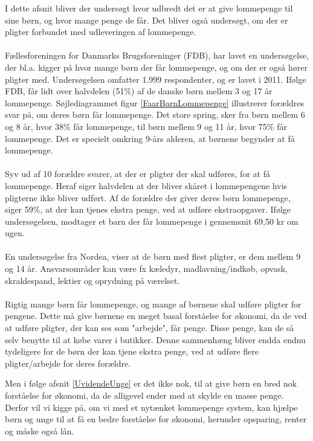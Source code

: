 I dette afsnit bliver der undersøgt hvor udbredt det er at give lommepenge til sine børn, og hvor mange penge de får. Det bliver også undersøgt, om der er pligter forbundet med udleveringen af lommepenge.\\
\\
Fællesforeningen for Danmarks Brugsforeninger (FDB), har lavet en undersøgelse, der bl.a. kigger på hvor mange børn der får lommepenge, og om der er også hører pligter med. \cite{FDB1} Undersøgelsen omfatter 1.999 respondenter, og er lavet i 2011.
Ifølge FDB, får lidt over halvdelen (51\%) af de danske børn mellem 3 og 17 år lommepenge. Søjlediagrammet figur \ref{FaarBarnLommepenge} illustrerer forældres svar på, om deres børn får lommepenge. Det store spring, sker fra børn mellem 6 og 8 år, hvor 38\% får lommepenge, til børn mellem 9 og 11 år, hvor 75\% får lommepenge. Det er specielt omkring 9-års alderen, at børnene begynder at få lommepenge. \\
\\
Syv ud af 10 forældre svarer, at der er pligter der skal udføres, for at få lommepenge. Heraf siger halvdelen at der bliver skåret i lommepengene hvis pligterne ikke bliver udført. Af de forældre der giver deres børn lommepenge, siger 59\%, at der kan tjenes ekstra penge, ved at udføre ekstraopgaver.
Ifølge undersøgelsen, modtager et barn der får lommepenge i gennemsnit 69,50 kr om ugen.\\
\\
En undersøgelse fra Nordea, viser at de børn med flest pligter, er dem mellem 9 og 14 år. Ansvarsområder kan være fx kæledyr, madlavning/indkøb, opvask, skraldespand, lektier og oprydning på værelset. \cite{Nordea1}\\
\\

Rigtig mange børn får lommepenge, og mange af børnene skal udføre pligter for pengene. Dette må give børnene en meget basal forståelse for økonomi, da de ved at udføre pligter, der kan ses som "arbejde", får penge. Disse penge, kan de så selv benytte til at købe varer i butikker. Denne sammenhæng bliver endda endnu tydeligere for de børn der kan tjene ekstra penge, ved at udføre flere pligter/arbejde for deres forældre.

Men i følge afsnit \ref{UvidendeUnge}  er det ikke nok, til at give børn en bred nok forståelse for økonomi, da de alligevel ender med at skylde en masse penge. Derfor vil vi kigge på, om vi med et nytænket lommepenge system, kan hjælpe børn og unge til at få en bedre forståelse for økonomi, herunder opsparing, renter og måske også lån.

